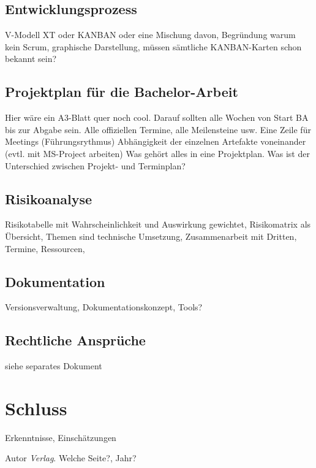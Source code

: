 \documentclass[a4paper,ngerman, 12pt]{report}
\begin{document}
\section{Entwicklungsprozess}
V-Modell XT oder KANBAN oder eine Mischung davon, Begründung warum kein Scrum, graphische Darstellung, müssen sämtliche KANBAN-Karten schon bekannt sein?


\section{Projektplan für die Bachelor-Arbeit}
Hier wäre ein A3-Blatt quer noch cool. Darauf sollten alle Wochen von Start BA bis zur Abgabe sein.
Alle offiziellen Termine, alle Meilensteine usw.
Eine Zeile für Meetings (Führungsrythmus)
Abhängigkeit der einzelnen Artefakte voneinander (evtl. mit MS-Project arbeiten)
Was gehört alles in eine Projektplan. Was ist der Unterschied zwischen Projekt- und Terminplan?

\section{Risikoanalyse}
Risikotabelle mit Wahrscheinlichkeit und Auswirkung gewichtet, Risikomatrix als Übersicht, Themen sind technische Umsetzung, Zusammenarbeit mit Dritten, Termine, Ressourcen, 

\section{Dokumentation}
Versionsverwaltung, Dokumentationskonzept, Tools?

\section{Rechtliche Ansprüche}
siehe separates Dokument


\chapter{Schluss}
Erkenntnisse, Einschätzungen




\begin{thebibliography}{9}
Autor
\textit{Verlag}. 
Welche Seite?, Jahr?
\end{thebibliography}
\end{document}
